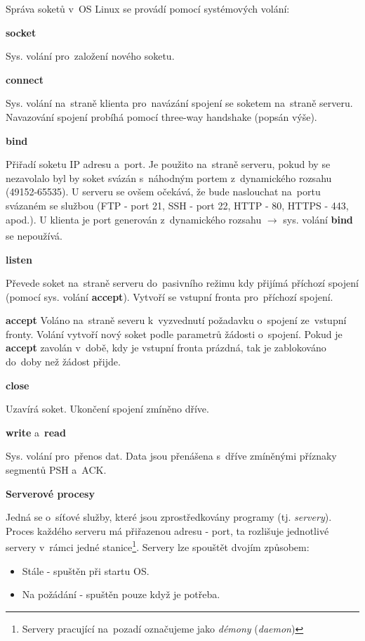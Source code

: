 Správa soketů v~OS Linux se provádí pomocí systémových volání:

\vspace{0,5cm}
\textbf{socket}

Sys. volání pro~založení nového soketu.

\vspace{0,5cm}
\textbf{connect}

Sys. volání na~straně klienta pro~navázání spojení se soketem na~straně serveru. Navazování spojení probíhá pomocí three-way handshake (popsán výše).

\vspace{0,5cm}
\textbf{bind}

Přiřadí soketu IP adresu a~port. Je použito na~straně serveru, pokud by se nezavolalo byl by soket svázán s~náhodným portem z~dynamického rozsahu (49152-65535). U serveru se ovšem očekává, že bude naslouchat na~portu svázaném se službou (FTP - port 21, SSH - port 22, HTTP - 80, HTTPS - 443, apod.). U klienta je port generován z~dynamického rozsahu $\xrightarrow[]{}$ sys. volání \textbf{bind} se nepoužívá.  

\vspace{0,5cm}
\textbf{listen}

Převede soket na~straně serveru do~pasivního režimu kdy přijímá příchozí spojení (pomocí sys. volání \textbf{accept}). Vytvoří se vstupní fronta pro~příchozí spojení.  

\vspace{0,5cm}
\textbf{accept}
Voláno na~straně severu k~vyzvednutí požadavku o~spojení ze~vstupní fronty. Volání vytvoří nový soket podle parametrů žádosti o~spojení. Pokud je \textbf{accept} zavolán v~době, kdy je vstupní fronta prázdná, tak je zablokováno do~doby než žádost přijde.

\vspace{0,5cm}
\textbf{close}

Uzavírá soket. Ukončení spojení zmíněno dříve.

\vspace{0,5cm}
\textbf{write} a~\textbf{read}

Sys. volání pro~přenos dat. Data jsou přenášena s~dříve zmíněnými příznaky segmentů PSH a~ACK.

\clearpage

\begin{Large} 
    \textbf{Serverové procesy}
\end{Large}

Jedná se o~síťové služby, které jsou zprostředkovány programy (tj. \emph{servery}). Proces každého serveru má přiřazenou adresu - port, ta rozlišuje jednotlivé servery v~rámci jedné stanice\footnote{Servery pracující na~pozadí označujeme jako \emph{démony} (\emph{daemon})}. Servery lze spouštět dvojím způsobem:
\begin{itemize}
    \item Stále - spuštěn při startu OS.
    \item Na požádání - spuštěn pouze když je potřeba.
\end{itemize}

